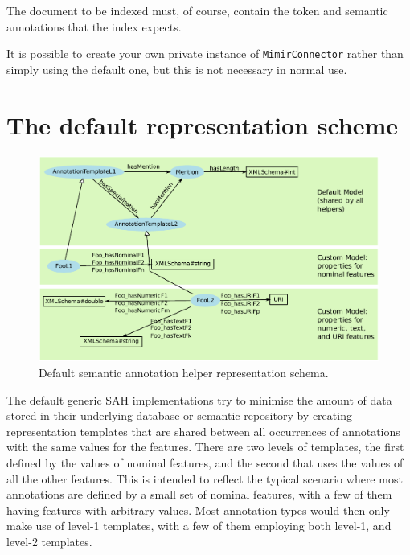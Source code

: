 The document to be indexed must, of course, contain the token and semantic
annotations that the index expects.

It is possible to create your own private instance of
\lstinline!MimirConnector! rather than simply using the default one, but this
is not necessary in normal use.

\section{The default representation scheme}\label{sec:indexing:dsah-detail}

\begin{figure}[htb]
\begin{center}
\includegraphics[scale=0.66]{img/dsah-model}
\caption{Default semantic annotation helper representation schema.}
\label{fig:dsah-model}
\end{center}
\end{figure}

The default generic SAH implementations try to minimise the amount of data stored in their underlying database or semantic repository
by creating representation templates that are shared
between all occurrences of annotations with the same values for the features.
There are two levels of templates, the first defined by the values of nominal
features, and the second that uses the values of all the other features. This
is intended to reflect the typical scenario where most annotations are defined
by a small set of nominal features, with a few of them having features with
arbitrary values. Most annotation types would then only make use of level-1
templates, with a few of them employing both level-1, and level-2 templates.

